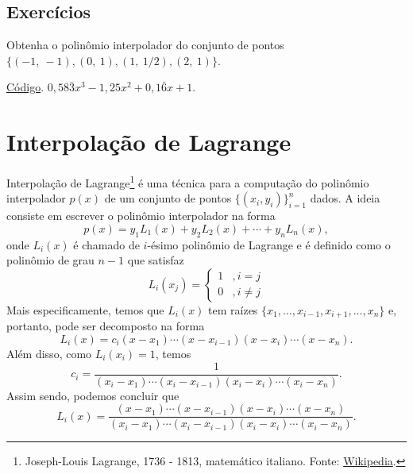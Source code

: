 \subsection*{Exercícios}

\begin{exer}\label{exer:interpoli_intro1}
  Obtenha o polinômio interpolador do conjunto de pontos $\{(-1,~-1), (0,~1), (1,~1/2), (2,~1)\}$.
\end{exer}
\begin{resp}
\ifisoctave
\href{https://github.com/phkonzen/notas/blob/master/src/MatematicaNumerica/cap_interp/dados/exer_interpoli_intro1/exer_interpoli_intro1.m}{Código}.
\fi
$0,58\bar{3}x^3 - 1,25x^2 + 0,1\bar{6}x + 1$.  
\end{resp}

\emconstrucao

\section{Interpolação de Lagrange}\label{cap_interp_sec_lagrange}

Interpolação de Lagrange\footnote{Joseph-Louis Lagrange, 1736 - 1813, matemático italiano. Fonte: \href{https://en.wikipedia.org/wiki/Joseph-Louis_Lagrange}{Wikipedia}.} é uma técnica para a computação do polinômio interpolador $p(x)$ de um conjunto de pontos $\{(x_i, y_i)\}_{i=1}^n$ dados. A ideia consiste em escrever o polinômio interpolador na forma
\begin{equation}
  p(x) = y_1L_1(x) + y_2L_2(x) + \cdots + y_nL_n(x),
\end{equation}
onde $L_i(x)$ é chamado de $i$-ésimo polinômio de Lagrange e é definido como o polinômio de grau $n-1$ que satisfaz
\begin{equation}
  L_i(x_j) = \left\{
    \begin{array}{ll}
      1 &, i=j\\
      0 &, i\neq j
    \end{array}
\right.
\end{equation}
Mais especificamente, temos que $L_i(x)$ tem raízes $\{x_1, \ldots, x_{i-1}, x_{i+1}, \ldots, x_n\}$ e, portanto, pode ser decomposto na forma
\begin{equation}
  L_i(x) = c_i(x-x_1)\cdots(x-x_{i-1})(x-x_i)\cdots(x-x_n).
\end{equation}
Além disso, como $L_i(x_i) = 1$, temos
\begin{equation}
  c_i = \frac{1}{(x_i-x_1)\cdots(x_i-x_{i-1})(x_i-x_i)\cdots(x_i-x_n)}.
\end{equation}
Assim sendo, podemos concluir que
\begin{equation}
  L_i(x) = \frac{(x-x_1)\cdots(x-x_{i-1})(x-x_i)\cdots(x-x_n)}{(x_i-x_1)\cdots(x_i-x_{i-1})(x_i-x_i)\cdots(x_i-x_n)}.
\end{equation}


